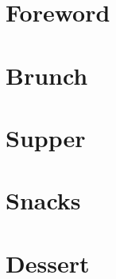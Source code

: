 \documentclass{recipe}
\begin{document}
\tableofcontents
\chapter{Foreword}


\chapter{Brunch}




\chapter{Supper}


\chapter{Snacks}

\chapter{Dessert}
\end{document}
